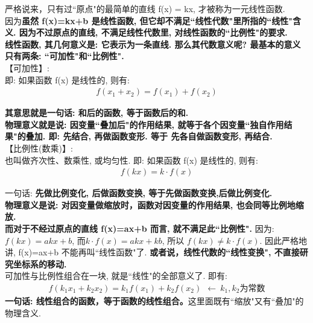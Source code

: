 \documentclass[UTF8]{ctexart}
\begin{document}
严格说来，只有过``原点"的最简单的直线 f(x) = kx, 才被称为一元线性函数.\\

因为\textbf{虽然 f(x)=kx+b 是线性函数, 但它却不满足``线性代数"里所指的``线性"含义. 因为不过原点的直线, 不满足线性代数里, 对线性函数的``比例性"的要求.}\\

\textbf{线性函数, 其几何意义是: 它表示为一条直线. 那么其代数意义呢? 最基本的意义只有两条: ``可加性"和``比例性". }\\

【可加性】:\\
即: 如果函数 f(x) 是线性的, 则有:
\begin{align*}
	\boxed{
	f\left( x_1+x_2 \right) =f\left( x_1 \right) +f\left( x_2 \right)	
	}
\end{align*}

\textbf{其意思就是一句话: 和后的函数, 等于函数后的和.} \\
\textbf{物理意义就是说: 因变量``叠加后"的作用结果, 就等于各个因变量``独自作用结果"的叠加. 即: 先结合, 再做函数变形. 等于 先各自做函数变形, 再结合.}\\


【比例性(数乘)】:\\
也叫做齐次性、数乘性, 或均匀性. 即: 如果函数 f(x) 是线性的, 则有:
\begin{align*}
	\boxed{
	f(kx) = k \cdot f(x)	
	}
\end{align*}

一句话: \textbf{先做比例变化, 后做函数变换, 等于先做函数变换,后做比例变化.}\\
\textbf{物理意义是说: 对因变量做缩放时，函数对因变量的作用结果, 也会同等比例地缩放.} \\

\textbf{而对于不经过原点的直线 f(x)=ax+b 而言, 就不满足此``比例性".} 因为: $f(kx) = akx+b$, 而$k\cdot f(x)=akx+kb$, 所以 $f(kx) \neq k \cdot f(x)$. 因此严格地讲, f(x)=ax+b 不能再叫``线性函数"了. \textbf{或者说，线性代数的``线性变换", 不直接研究坐标系的移动.}\\

可加性与比例性组合在一块, 就是``线性"的全部意义了. 即有:
\begin{align*}
f\left( k_1x_1+k_2x_2 \right) =k_1f\left( x_1 \right) +k_2f\left( x_2 \right) \ \ ←\ k_1,k_2\text{为常数}
\end{align*}
\textbf{一句话: 线性组合的函数，等于函数的线性组合。}这里面既有``缩放"又有``叠加"的物理含义.\\
\end{document}
